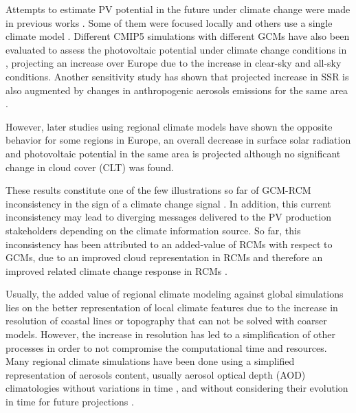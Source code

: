Attempts to estimate PV potential in the future under climate change were made in previous works \cite*{Crook2011, panagea2014, Gaetani2014, Burnett2014}. Some of them were focused locally \cite*{panagea2014, Burnett2014} and others use a single climate model \cite*{Crook2011}. Different CMIP5 simulations with different GCMs have also been evaluated to assess the photovoltaic potential under climate change conditions in \cite*{Wild2015}, projecting an increase over Europe due to the increase in clear-sky and all-sky conditions. Another sensitivity study has shown that projected increase in SSR is also augmented by changes in anthropogenic aerosols emissions for the same area \cite*{Gaetani2014}.

However, later studies using regional climate models \cite*{Jerez2015, Bartok2017} have shown the opposite behavior for some regions in Europe, an overall decrease in surface solar radiation and photovoltaic potential in the same area is projected although no significant change in cloud cover (CLT) was found. %

These results constitute one of the few illustrations so far of GCM-RCM inconsistency in the sign of a climate change signal \cite*{Bartok2017}. In addition, this current inconsistency may lead to diverging messages delivered to the PV production stakeholders depending on the climate information source. So far, this inconsistency has been attributed to an added-value of RCMs with respect to GCMs, due to an improved cloud representation in RCMs and therefore an improved related climate change response in RCMs \cite*{Bartok2017}.

Usually, the added value of regional climate modeling against global simulations lies on the better representation of local climate features due to the increase in resolution of coastal lines or topography that can not be solved with coarser models. However, the increase in resolution has led to a simplification of other processes in order to not compromise the computational time and resources. Many regional climate simulations have been done using a simplified representation of aerosols content, usually aerosol optical depth (AOD) climatologies without variations in time \cite*{Nabat2013, Nabat2014}, and without considering their evolution in time for future projections \cite*{Bartok2017}.



